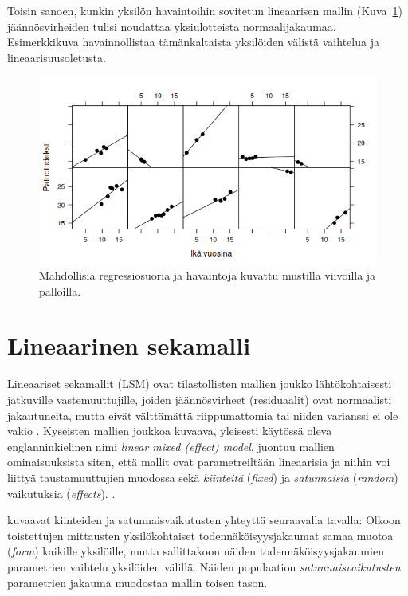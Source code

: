 \documentclass[finnish]{docopts}
\begin{document}
Toisin sanoen, kunkin yksilön havaintoihin sovitetun lineaarisen mallin (Kuva~\ref{fig:xyplot}) jäännösvirheiden tulisi noudattaa yksiulotteista normaalijakaumaa. Esimerkkikuva havainnollistaa tämänkaltaista yksilöiden välistä vaihtelua ja lineaarisuusoletusta.\\

\begin{figure}[H]
\centering
  \includegraphics[scale=0.8]{kuvaajat/xyplot.png}
  \caption{Mahdollisia regressiosuoria ja havaintoja kuvattu mustilla viivoilla ja palloilla.}
  \label{fig:xyplot}
\end{figure}

\section{Lineaarinen sekamalli}
\label{sec:lsm}

Lineaariset sekamallit (LSM) ovat tilastollisten mallien joukko lähtökohtaisesti jatkuville vastemuuttujille, joiden jäännösvirheet (residuaalit) ovat normaalisti jakautuneita, mutta eivät välttämättä riippumattomia tai niiden varianssi ei ole vakio \citep{west14}. Kyseisten mallien joukkoa kuvaava, yleisesti käytössä oleva englanninkielinen nimi \textit{linear mixed (effect) model}, juontuu mallien ominaisuuksista siten, että mallit ovat parametreiltään lineaarisia ja niihin voi liittyä taustamuuttujien muodossa sekä \textit{kiinteitä} (\textit{fixed}) ja \textit{satunnaisia} (\textit{random}) vaikutuksia (\textit{effects}). \citep{west14}.

\cite{laird82} kuvaavat kiinteiden ja satunnaisvaikutusten yhteyttä seuraavalla tavalla: Olkoon toistettujen mittausten yksilökohtaiset todennäköisyysjakaumat samaa muotoa (\textit{form}) kaikille yksilöille, mutta sallittakoon näiden todennäköisyysjakaumien parametrien vaihtelu yksilöiden välillä. Näiden populaation \textit{satunnaisvaikutusten} parametrien jakauma muodostaa mallin toisen tason.
\end{document}
